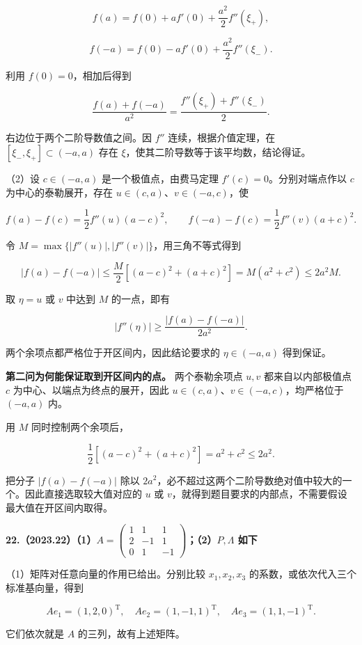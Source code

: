 \documentclass[UTF8,11pt,fontset=windows]{ctexart}
\begin{document}
$$
f(a)=f(0)+af'(0)+\frac{a^2}{2}f''(\xi_+),
$$

$$
f(-a)=f(0)-af'(0)+\frac{a^2}{2}f''(\xi_-).
$$

利用 $f(0)=0$，相加后得到

$$
\frac{f(a)+f(-a)}{a^2}=\frac{f''(\xi_+)+f''(\xi_-)}2.
$$

右边位于两个二阶导数值之间。因 $f''$ 连续，根据介值定理，在 $[\xi_-,\xi_+]\subset(-a,a)$ 存在 $\xi$，使其二阶导数等于该平均数，结论得证。

（2）设 $c\in(-a,a)$ 是一个极值点，由费马定理 $f'(c)=0$。分别对端点作以 $c$ 为中心的泰勒展开，存在 $u\in(c,a)$、$v\in(-a,c)$，使

$$
f(a)-f(c)=\frac12f''(u)(a-c)^2,\qquad
f(-a)-f(c)=\frac12f''(v)(a+c)^2.
$$

令 $M=\max\{|f''(u)|,|f''(v)|\}$，用三角不等式得到

$$
|f(a)-f(-a)|\le\frac M2[(a-c)^2+(a+c)^2]
=M(a^2+c^2)\le2a^2M.
$$

取 $\eta=u$ 或 $v$ 中达到 $M$ 的一点，即有

$$
|f''(\eta)|\ge\frac{|f(a)-f(-a)|}{2a^2}.
$$

两个余项点都严格位于开区间内，因此结论要求的 $\eta\in(-a,a)$ 得到保证。

\textbf{第二问为何能保证取到开区间内的点。} 两个泰勒余项点 $u,v$ 都来自以内部极值点 $c$ 为中心、以端点为终点的展开，因此 $u\in(c,a)$、$v\in(-a,c)$，均严格位于 $(-a,a)$ 内。

用 $M$ 同时控制两个余项后，

$$
\frac12[(a-c)^2+(a+c)^2]=a^2+c^2\le2a^2.
$$

把分子 $|f(a)-f(-a)|$ 除以 $2a^2$，必不超过这两个二阶导数绝对值中较大的一个。因此直接选取较大值对应的 $u$ 或 $v$，就得到题目要求的内部点，不需要假设最大值在开区间内取得。

\clearpage

\textbf{22.（2023.22）（1）$A=\begin{pmatrix}1&1&1\\2&-1&1\\0&1&-1\end{pmatrix}$；（2）$P,\Lambda$ 如下}

（1）矩阵对任意向量的作用已给出。分别比较 $x_1,x_2,x_3$ 的系数，或依次代入三个标准基向量，得到

$$
Ae_1=(1,2,0)^{\mathrm T},\quad Ae_2=(1,-1,1)^{\mathrm T},\quad
Ae_3=(1,1,-1)^{\mathrm T}.
$$

它们依次就是 $A$ 的三列，故有上述矩阵。
\end{document}
